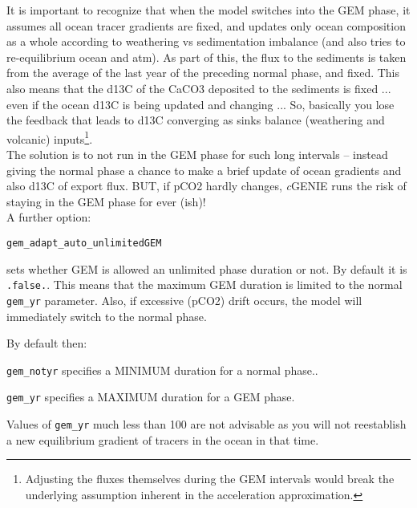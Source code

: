 \documentclass[10pt,twoside]{article}
\begin{document}
It is important to recognize that when the model switches into the GEM phase, it assumes all ocean tracer gradients are fixed, and updates only ocean composition as a whole according to weathering vs sedimentation imbalance (and also tries to re-equilibrium ocean and atm). As part of this, the flux to the sediments is taken from the average of the last year of the preceding normal phase, and fixed. This also means that the d13C of the CaCO3 deposited to the sediments is fixed ... even if the ocean d13C is being updated and changing ... So, basically you lose the feedback that leads to d13C converging as sinks balance (weathering and volcanic) inputs\footnote{Adjusting the fluxes themselves during the GEM intervals would break the underlying assumption inherent in the acceleration approximation.}.
\\The solution is to not run in the GEM phase for such long intervals -- instead giving the normal phase a chance to make a brief update of ocean gradients and also d13C of export flux. BUT, if pCO2 hardly changes, \textit{c}GENIE runs the risk of staying in the GEM phase for ever (ish)!
\\ A further option:
\vspace{-5pt}\begin{verbatim}
gem_adapt_auto_unlimitedGEM
\end{verbatim}\vspace{-5pt}
sets whether GEM is allowed an unlimited phase duration or not. By default it is \texttt{.false.}. This means that the maximum GEM duration is limited to the normal \texttt{gem\_yr} parameter. Also, if excessive (pCO2) drift occurs, the model will immediately switch to the normal phase.

By default then:
\begin{compactitem}
        \item \texttt{gem\_notyr} specifies a MINIMUM duration for a normal phase..
        \item \texttt{gem\_yr} specifies a MAXIMUM duration for a GEM phase.
\end{compactitem}
Values of \texttt{gem\_yr} much less than 100 are not advisable as you will not reestablish a new equilibrium gradient of tracers in the ocean in that time.

\end{document}
